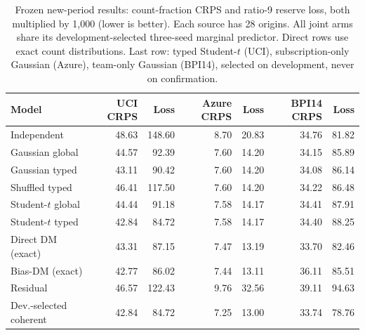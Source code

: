 \begin{table}[t]
\centering\small
\caption{Frozen new-period results: count-fraction CRPS and ratio-9 reserve loss, both multiplied by 1,000 (lower is better). Each source has 28 origins. All joint arms share its development-selected three-seed marginal predictor. Direct rows use exact count distributions. Last row: typed Student-$t$ (UCI), subscription-only Gaussian (Azure), team-only Gaussian (BPI14), selected on development, never on confirmation.}\label{tab:extension-counts}
\begin{tabular}{lrrrrrr}
\toprule
Model & UCI CRPS & Loss & Azure CRPS & Loss & BPI14 CRPS & Loss \\
\midrule
Independent & 48.63 & 148.60 & 8.70 & 20.83 & 34.76 & 81.82 \\
Gaussian global & 44.57 & 92.39 & 7.60 & 14.20 & 34.15 & 85.89 \\
Gaussian typed & 43.11 & 90.42 & 7.60 & 14.20 & 34.08 & 86.14 \\
Shuffled typed & 46.41 & 117.50 & 7.60 & 14.20 & 34.22 & 86.48 \\
Student-$t$ global & 44.44 & 91.18 & 7.58 & 14.17 & 34.41 & 87.91 \\
Student-$t$ typed & 42.84 & 84.72 & 7.58 & 14.17 & 34.40 & 88.25 \\
Direct DM (exact) & 43.31 & 87.15 & 7.47 & 13.19 & 33.70 & 82.46 \\
Bias-DM (exact) & 42.77 & 86.02 & 7.44 & 13.11 & 36.11 & 85.51 \\
Residual & 46.57 & 122.43 & 9.76 & 32.56 & 39.11 & 94.63 \\
Dev.-selected coherent & 42.84 & 84.72 & 7.25 & 13.00 & 33.74 & 78.76 \\
\bottomrule
\end{tabular}
\end{table}
